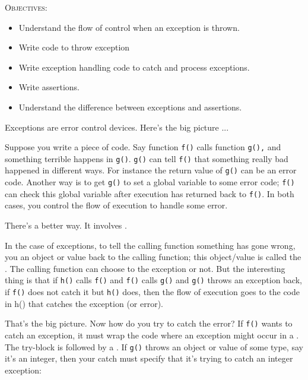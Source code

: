 \newpage{}

\textsc{Objectives:}

\begin{itemize}
\item
  Understand the flow of control when an exception is thrown.
\item
  Write code to throw exception
\item
  Write exception handling code to catch and process exceptions.
\item
  Write assertions.
\item
  Understand the difference between exceptions and assertions.
\end{itemize}

\newpage{}

Exceptions are error control devices. Here's the big picture ...

Suppose you write a piece of code. Say function \texttt{f()} calls
function \texttt{g(),} and something terrible happens in \texttt{g()}.
\texttt{g()} can tell \texttt{f()} that something really bad happened in
different ways. For instance the return value of \texttt{g()} can be an
error code. Another way is to get \texttt{g()} to set a global variable to
some error code; \texttt{f()} can check this global variable after
execution has returned back to \texttt{f()}. In both cases, you control
the flow of execution to handle some error.

There's a better way. It involves .

In the case of exceptions, to tell the calling function something has gone wrong, you  an object or value back to the calling function; this object/value is called the . The calling function can choose to  the exception or not. But the interesting thing is that if \texttt{h()} calls \texttt{f()} and \texttt{f()} calls \texttt{g()} and \texttt{g()} throws an exception back, if \texttt{f()} does not catch it but \texttt{h()} does, then the flow of execution goes to the code in h() that catches the exception (or error).

That's the big picture. Now how do you try to catch the error? If \texttt{f()} wants to catch an exception, it must wrap the code where an exception might occur in a . The try-block is followed by a . If \texttt{g()} throws an object or value of some type, say it's an integer, then your catch must specify that it's trying to catch an integer exception:

